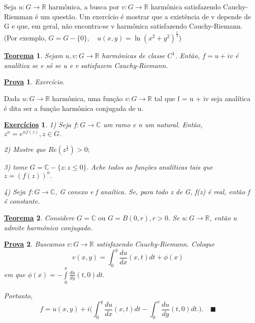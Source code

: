 \documentclass{article}
\newtheorem*{theorem*}{\underline{Teorema}}
\newtheorem*{proof*}{\underline{Prova}}
\newtheorem*{exer*}{\underline{Exerc\'icios}}
\renewcommand\qedsymbol{$\blacksquare$}
\begin{document}
  Seja $u:G\rightarrow \mathbb{R}$ harm\^onica, a busca por $v:G\rightarrow \mathbb{R}$ harm\^onica 
  satisfazendo Cauchy-Riemman \'e um quest\~ao. Um exerc\'icio \'e mostrar que a exist\^encia de v
  depende de G e que, em geral, n\~ao encontra-se v harm\^onica satisfazendo Cauchy-Riemann. 
  (Por exemplo, $G = G - \{0\}, \quad u(x, y) = \ln{(x ^{2} + y ^{2})}^{\frac{1}{2}}$)
  \begin{theorem*}
    Sejam $u, v:G\rightarrow \mathbb{R}$ harm\^onicas de classe $C^1$. Ent\~ao, $f = u + iv$
    \'e anal\'itica se e s\'o se u e v satisfazem Cauchy-Riemann.
  \end{theorem*}
  \begin{proof*}
    Exerc\'icio.
  \end{proof*}
  Dada $u:G\rightarrow \mathbb{R}$ harm\^onica, uma fun\c c\~ao $v:G\rightarrow \mathbb{R}$
  tal que f = u + iv seja anal\'itica \'e dita ser a fun\c c\~ao harm\^onica conjugada de u.
  \begin{exer*}
  \item[1)] Seja $f:G\rightarrow \mathbb{C}$  um ramo e n um natural. Ent\~ao, $z ^{n} = e ^{nf(z)}, z\in{G}.$
  \item[2)] Mostre que $Re(z ^{\frac{1}{2}}) > 0;$
  \item[3)] tome $G = \mathbb{C} - \{z: z\leq{0}\}.$ Ache todos as fun\c c\~oes anal\'iticas
    tais que $z = (f(z))^{n}.$
  \item[4)] Seja $f:G\rightarrow \mathbb{C}$, G conexo e f ana\'itica. Se, para todo
    z de G, f(z) \'e real, ent\~ao f \'e constante.
  \end{exer*}
  \begin{theorem*}
    Considere $G = \mathbb{C} \text{ ou } G = B(0, r), r > 0.$ Se $u:G\rightarrow \mathbb{R}$, 
    ent\~ao u admite harm\^onico conjugado.
  \end{theorem*}
  \begin{proof*}
    Buscamos $v:G\rightarrow \mathbb{R}$ satisfazendo Cauchy-Riemann. Coloque 
    $$
    v(x, y) = \int_{0}^{y}\frac{du}{dx}(x, t)dt + \phi(x)
    $$
    em que $\phi(x) = -\int\limits_{0}^{x}\frac{du}{dy}(t, 0)dt.$

    Portanto, 
    $$
    f = u(x, y) + i\biggl(\int_{0}^{y}\frac{du}{dx}(x, t)dt - \int_{0}^{x}\frac{du}{dy}(t, 0)dt.\biggr).\quad\text{\qedsymbol}
    $$
  \end{proof*}
\end{document}
